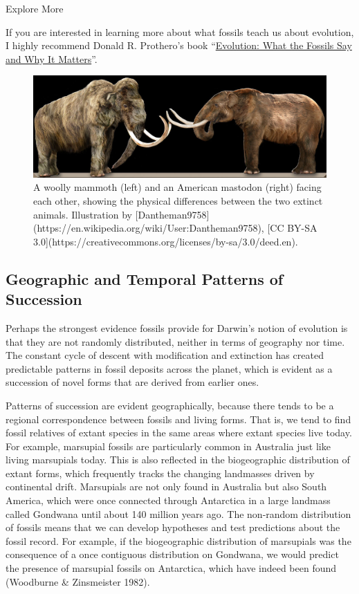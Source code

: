 \documentclass[
]{book}
\begin{document}
Explore More

If you are interested in learning more about what fossils teach us about evolution, I highly recommend Donald R. Prothero's book ``\href{https://cup.columbia.edu/book/evolution/9780231139625}{Evolution: What the Fossils Say and Why It Matters}''.

\begin{figure}
\includegraphics[width=1\linewidth]{images/MammothVsMastodon} \caption{A woolly mammoth (left) and an American mastodon (right) facing each other, showing the physical differences between the two extinct animals. Illustration by [Dantheman9758](https://en.wikipedia.org/wiki/User:Dantheman9758), [CC BY-SA 3.0](https://creativecommons.org/licenses/by-sa/3.0/deed.en).}\label{fig:mammoth}
\end{figure}

\hypertarget{geographic-and-temporal-patterns-of-succession}{%
\subsection{Geographic and Temporal Patterns of Succession}\label{geographic-and-temporal-patterns-of-succession}}

Perhaps the strongest evidence fossils provide for Darwin's notion of evolution is that they are not randomly distributed, neither in terms of geography nor time. The constant cycle of descent with modification and extinction has created predictable patterns in fossil deposits across the planet, which is evident as a succession of novel forms that are derived from earlier ones.

Patterns of succession are evident geographically, because there tends to be a regional correspondence between fossils and living forms. That is, we tend to find fossil relatives of extant species in the same areas where extant species live today. For example, marsupial fossils are particularly common in Australia just like living marsupials today. This is also reflected in the biogeographic distribution of extant forms, which frequently tracks the changing landmasses driven by continental drift. Marsupials are not only found in Australia but also South America, which were once connected through Antarctica in a large landmass called Gondwana until about 140 million years ago. The non-random distribution of fossils means that we can develop hypotheses and test predictions about the fossil record. For example, if the biogeographic distribution of marsupials was the consequence of a once contiguous distribution on Gondwana, we would predict the presence of marsupial fossils on Antarctica, which have indeed been found (Woodburne \& Zinsmeister 1982).
\end{document}
